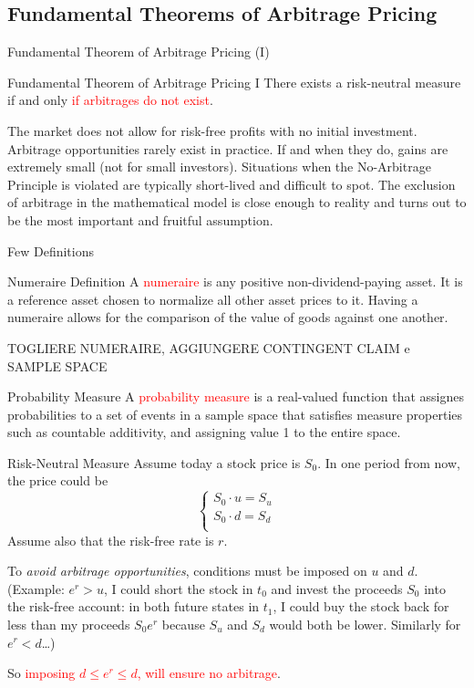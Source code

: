 \documentclass{beamer}
\begin{document}
\subsection{Fundamental Theorems of Arbitrage Pricing}
\begin{frame}{Fundamental Theorem of Arbitrage Pricing (I)}
	\begin{block}{Fundamental Theorem of Arbitrage Pricing I}
		There exists a risk-neutral measure if and only \textcolor{red}{if arbitrages do not exist}.
	\end{block}
	\vspace{1cm}
	The market does not allow for risk-free profits with no initial investment.
	Arbitrage opportunities rarely exist in practice. If and when they do, gains are extremely small (not for small investors). Situations when the No-Arbitrage Principle is violated are typically short-lived and difficult to spot. 
	The exclusion of arbitrage in the mathematical model is close enough to reality and turns out to be the most important and fruitful assumption.
\end{frame}

\begin{frame}{Few Definitions}
	\begin{block}{Numeraire Definition}
		A \textcolor{red}{numeraire} is any positive non-dividend-paying asset. It is a reference asset chosen to normalize all other asset prices to it. Having a numeraire allows for the comparison of the value of goods against one another.
	\end{block}
TOGLIERE NUMERAIRE, AGGIUNGERE CONTINGENT CLAIM e SAMPLE SPACE
\begin{block}{Probability Measure}
		A \textcolor{red}{probability measure} is a real-valued function that assignes probabilities to a set of events in a sample space that satisfies measure properties such as countable additivity, and assigning value 1 to the entire space.
	\end{block}	
\end{frame}

\begin{frame}{Risk-Neutral Measure}
Assume today a stock price is $S_0$. In one period from now, the price could be 
\begin{equation*}
	\begin{cases}
		S_0\cdot u = S_u \\
		S_0\cdot d = S_d \\ 
	\end{cases}
\end{equation*}
Assume also that the risk-free rate is $r$.

To \emph{avoid arbitrage opportunities}, conditions must be imposed on $u$ and $d$. (Example: $e^r > u$, I could short the stock in $t_0$ and invest the proceeds $S_0$ into the risk-free account: in both future states in $t_1$, I could buy the stock back for less than my proceeds $S_0e^r$ because $S_u$ and $S_d$ would both be lower. Similarly for $e^r < d$\ldots)

So \textcolor{red}{imposing $d\le e^r \le d$, will ensure no arbitrage}.
\end{frame}
\end{document}
